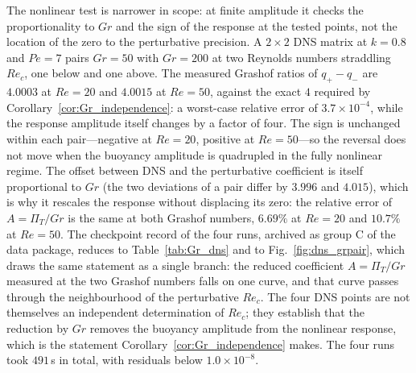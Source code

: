 \documentclass[12pt,a4paper]{article}
\newcommand{\Rey}{\mathit{Re}}
\newcommand{\Pe}{\mathit{Pe}}
\newcommand{\Grr}{\mathit{Gr}}
\newcommand{\PiT}{\Pi_T}
\begin{document}
The nonlinear test is narrower in scope: at finite amplitude it checks the
proportionality to $\Grr$ and the sign of the response at the tested points, not the
location of the zero to the perturbative precision. A $2\times2$
DNS matrix at $k=0.8$ and $\Pe=7$ pairs $\Grr=50$ with $\Grr=200$ at two Reynolds
numbers straddling $\Rey_c$, one below and one above. The measured Grashof ratios
of $q_+-q_-$ are $4.0003$ at $\Rey=20$ and $4.0015$ at $\Rey=50$, against the exact
$4$ required by Corollary~\ref{cor:Gr_independence}: a worst-case relative error of
$3.7\times10^{-4}$, while the response amplitude itself changes by a factor of
four. The sign is unchanged within each pair---negative at $\Rey=20$, positive at
$\Rey=50$---so the reversal does not move when the buoyancy amplitude is quadrupled
in the fully nonlinear regime. The offset between DNS and the perturbative
coefficient is itself proportional to $\Grr$ (the two deviations of a pair differ
by $3.996$ and $4.015$), which is why it rescales the response without displacing
its zero: the relative error of $A=\PiT/\Grr$ is the same at both Grashof numbers,
$6.69\%$ at $\Rey=20$ and $10.7\%$ at $\Rey=50$. The checkpoint record of the
four runs, archived as group C of the data package, reduces to Table~\ref{tab:Gr_dns} and to
Fig.~\ref{fig:dns_grpair}, which draws the same statement as a single branch:
the reduced coefficient $A=\PiT/\Grr$ measured at the two Grashof numbers falls on
one curve, and that curve passes through the neighbourhood of the perturbative
$\Rey_c$. The four DNS points are not themselves an independent determination of
$\Rey_c$; they establish that the reduction by $\Grr$ removes the buoyancy amplitude
from the nonlinear response, which is the statement Corollary~\ref{cor:Gr_independence}
makes. The four runs
took $491$\,s in total, with residuals below $1.0\times10^{-8}$.
\end{document}
